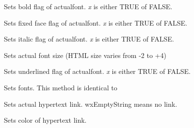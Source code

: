 Sets bold flag of actualfont. {\it x} is either TRUE of FALSE.

\label{wxhtmlwinparsersetfontfixed}


Sets fixed face flag of actualfont. {\it x} is either TRUE of FALSE.

\label{wxhtmlwinparsersetfontitalic}


Sets italic flag of actualfont. {\it x} is either TRUE of FALSE.

\label{wxhtmlwinparsersetfontsize}


Sets actual font size (HTML size varies from -2 to +4)

\label{wxhtmlwinparsersetfontunderlined}


Sets underlined flag of actualfont. {\it x} is either TRUE of FALSE.

\label{wxhtmlwinparsersetfonts}


Sets fonts. This method is identical to 

\label{wxhtmlwinparsersetlink}


Sets actual hypertext link. wxEmptyString means no link.

\label{wxhtmlwinparsersetlinkcolor}


Sets color of hypertext link.

